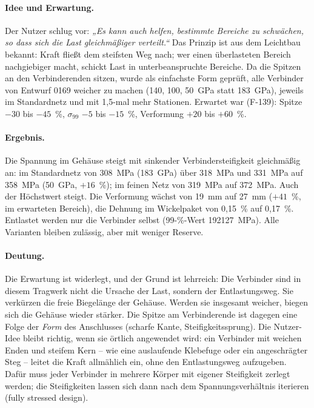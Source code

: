 \paragraph{Idee und Erwartung.} Der Nutzer schlug vor: \emph{„Es kann auch helfen, bestimmte Bereiche zu schwächen, so
dass sich die Last gleichmäßiger verteilt.“} Das Prinzip ist aus dem Leichtbau bekannt: Kraft fließt dem steifsten
Weg nach; wer einen überlasteten Bereich nachgiebiger macht, schickt Last in unterbeanspruchte Bereiche. Da die
Spitzen an den Verbinderenden sitzen, wurde als einfachste Form geprüft, alle Verbinder von Entwurf 0169 weicher zu
machen (\SI{140}{}, \SI{100}{}, \SI{50}{GPa} statt \SI{183}{GPa}), jeweils im Standardnetz und mit 1,5-mal mehr
Stationen. Erwartet war (F-139): Spitze $-30$ bis $-45$~\%, $\sigma_{99}$ $-5$ bis $-15$~\%, Verformung $+20$ bis
$+60$~\%.

\begin{table}[H]\centering\scriptsize\caption{0169 mit weicheren Verbindern. Nummern:
1xx Standardnetz, 2xx 1,5-mal mehr Stationen; Original \SI{183}{GPa}: \SI{308}{MPa} bzw.\ \SI{319}{MPa}.}\end{table}

\paragraph{Ergebnis.} Die Spannung im Gehäuse steigt mit sinkender Verbindersteifigkeit gleichmäßig an: im
Standardnetz von \SI{308}{MPa} (\SI{183}{GPa}) über \SI{318}{MPa} und \SI{331}{MPa} auf \SI{358}{MPa}
(\SI{50}{GPa}, $+16$~\%); im feinen Netz von \SI{319}{MPa} auf \SI{372}{MPa}. Auch der Höchstwert steigt. Die
Verformung wächst von \SI{19}{mm} auf \SI{27}{mm} ($+41$~\%, im erwarteten Bereich), die Dehnung im Wickelpaket von
0,15~\% auf 0,17~\%. Entlastet werden nur die Verbinder selbst (99-\%-Wert \SI{192}{\to}\SI{127}{MPa}). Alle
Varianten bleiben zulässig, aber mit weniger Reserve.

\paragraph{Deutung.} Die Erwartung ist widerlegt, und der Grund ist lehrreich: Die Verbinder sind in diesem Tragwerk
nicht die Ursache der Last, sondern der Entlastungsweg. Sie verkürzen die freie Biegelänge der Gehäuse. Werden sie
insgesamt weicher, biegen sich die Gehäuse wieder stärker. Die Spitze am Verbinderende ist dagegen eine Folge der
\emph{Form} des Anschlusses (scharfe Kante, Steifigkeitssprung). Die Nutzer-Idee bleibt richtig, wenn sie örtlich
angewendet wird: ein Verbinder mit weichen Enden und steifem Kern -- wie eine auslaufende Klebefuge oder ein
angeschrägter Steg -- leitet die Kraft allmählich ein, ohne den Entlastungsweg aufzugeben. Dafür muss jeder Verbinder
in mehrere Körper mit eigener Steifigkeit zerlegt werden; die Steifigkeiten lassen sich dann nach dem
Spannungsverhältnis iterieren (fully stressed design).
